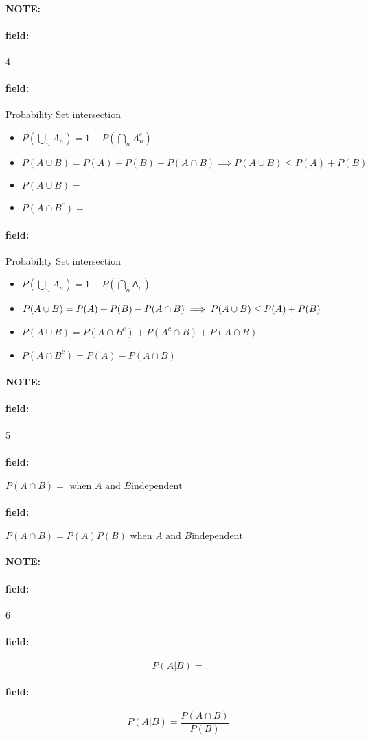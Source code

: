 \documentclass[12pt]{article}
\newenvironment{note}{\paragraph{NOTE:}}{}
\newenvironment{field}{\paragraph{field:}}{}
\begin{document}
\begin{note}
  \begin{field}
    \tiny 4
  \end{field}
  \begin{field}
    Probability Set intersection
    \begin{itemize}
      \item $P(\bigcup_n A_n)
        = 1 - P(\bigcap_n A_n^c)$
      \item $P(A \cup B) = P(A) + P(B) - P(A \cap B)
        \implies P(A \cup B) \leq P(A) + P(B)$
      \item $P(A \cup B)
        = $
      \item $P(A \cap B^c) = $
    \end{itemize}
  \end{field}
  \begin{field}
    Probability Set intersection
    \begin{itemize}
      \item $P(\bigcup_n A_n)
        = 1 - P(\bigcap_n \mathsf{A_n})$
      \item $P(A \cup B) = P(A) + P(B) - P(A \cap B)\\[1ex]
        \implies P(A \cup B) \le P(A) + P(B)$
      \item $P(A \cup B)
        = P(A \cap B^c) + P(A^c \cap B) + P(A \cap B)$
      \item $P(A \cap B^c) = P(A) - P(A \cap B)$
    \end{itemize}
  \end{field}
\end{note}

\begin{note}
  \begin{field}
    \tiny 5
  \end{field}
  \begin{field}
    $P(A \cap B) =  \text{ when }A \text{ and } B \text{independent}$
  \end{field}
  \begin{field}
    $P(A \cap B) = P(A)P(B) \text{ when }A \text{ and } B \text{independent}$
  \end{field}
  \end{note}

\begin{note}
  \begin{field}
    \tiny 6
  \end{field}
  \begin{field}
    $$P(A|B) = $$
  \end{field}
  \begin{field}
    $$P(A|B) = \frac{P(A\cap B)}{P(B)}$$
  \end{field}
\end{note}
\end{document}
